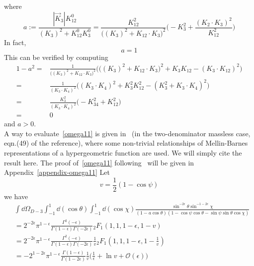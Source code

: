 where 
\begin{equation*}
a := \frac{|\vec{K}_3|K_{12}^0}{(K_3)^2 + K_{12}^0 K_3^0}
= \frac{K_{12}^2}{\big((K_3)^2 + K_{12}\cdot K_3\big)^2}\Big( -K_3^2 + \frac{(K_2\cdot K_3)^2}{K_{12}^2}\Big)
\end{equation*}
In fact, 
\begin{equation*}
a = 1
\end{equation*}
This can be verified by computing
\begin{equation*}
\begin{split}
1-a^2 = &
\frac{1}{\big((K_3)^2 + K_{12}\cdot K_3\big)^2}
\Big( \big( (K_3)^2 + K_{12}\cdot K_3 \big)^2 + K_3K_{12} - (K_3\cdot K_{12})^2
\Big)
\\
= &
\frac{1}{(K_3\cdot K_4)^2} \Big( (K_3\cdot K_4)^2 + K_3^2K_{12}^2 - (K_3^2 + K_3\cdot K_4)^2 \Big)
\\
= &
\frac{K_3^2}{(K_3\cdot K_4)^2}\Big(-K_{34}^2 + K_{12}^2\Big)
\\
= & 0
\end{split}
\end{equation*}
and $a>0$.
\\
A way to evaluate~\cref{omega11} is given in~\cite{Somogyi:2011ir} (in the two-denominator massless case, eqn.(49) of the reference), where some non-trivial relationships of Mellin-Barnes representations of a hypergeometric function are used.
We will simply cite the result here.
The proof of~\cref{omega11} following~\cite{Somogyi:2011ir} will be given in Appendix~\ref{appendix-omega11}
Let 
\begin{equation*}
v = \frac{1}{2}(1-\cos\psi)
\end{equation*}
we have
\begin{equation}\label{omega11}
\begin{split}
& \int \dd \Omega_{D-3}
\int_{-1}^1 \dd(\cos\theta)\int_{-1}^1\dd(\cos \chi)\frac{\sin^{-2\epsilon}\theta \sin^{-1-2\epsilon}\chi}{(1-a\cos\theta)(1-\cos\psi\cos\theta  - \sin\psi\sin\theta\cos\chi)}
\\
& = 
2^{-2\epsilon}\pi^{1-\epsilon}\frac{\Gamma^2(-\epsilon)}{\Gamma(1-\epsilon)\Gamma(-2\epsilon)}{}_2F_1(1,1,1-\epsilon, 1-v)
\\
& = 
2^{-2\epsilon}\pi^{1-\epsilon}\frac{\Gamma^2(-\epsilon)}{\Gamma(1-\epsilon)\Gamma(-2\epsilon)} \frac{1}{v}{}_2F_1(1,1,1-\epsilon, 1-\frac{1}{v})
\\
& = 
-2^{1-2\epsilon}\pi^{1-\epsilon} \frac{\Gamma(1-\epsilon)}{\Gamma(1-2\epsilon)}\frac{1}{v}\Big(\frac{1}{\epsilon}
+\ln v + \mathcal{O}(\epsilon)\Big)
\end{split}
\end{equation}
